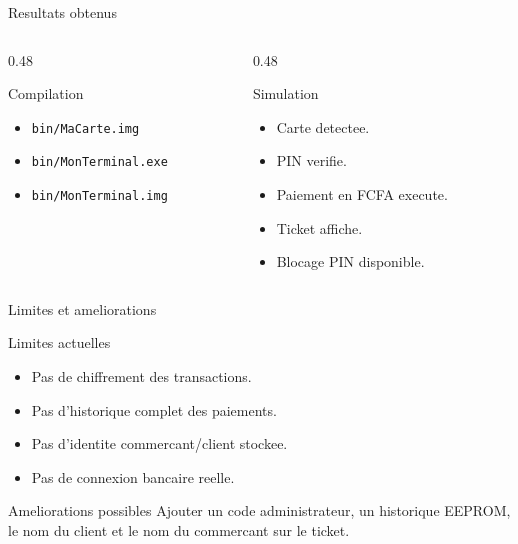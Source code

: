 \documentclass[aspectratio=169,11pt]{beamer}
\begin{document}
\begin{frame}{Resultats obtenus}
  \begin{columns}[T]
    \begin{column}{0.48\textwidth}
      \begin{block}{Compilation}
        \begin{itemize}
          \item \texttt{bin/MaCarte.img}
          \item \texttt{bin/MonTerminal.exe}
          \item \texttt{bin/MonTerminal.img}
        \end{itemize}
      \end{block}
    \end{column}
    \begin{column}{0.48\textwidth}
      \begin{block}{Simulation}
        \begin{itemize}
          \item Carte detectee.
          \item PIN verifie.
          \item Paiement en FCFA execute.
          \item Ticket affiche.
          \item Blocage PIN disponible.
        \end{itemize}
      \end{block}
    \end{column}
  \end{columns}
\end{frame}

\begin{frame}{Limites et ameliorations}
  \begin{block}{Limites actuelles}
    \begin{itemize}
      \item Pas de chiffrement des transactions.
      \item Pas d'historique complet des paiements.
      \item Pas d'identite commercant/client stockee.
      \item Pas de connexion bancaire reelle.
    \end{itemize}
  \end{block}
  \begin{block}{Ameliorations possibles}
    Ajouter un code administrateur, un historique EEPROM, le nom du client et le nom du commercant sur le ticket.
  \end{block}
\end{frame}
\end{document}
